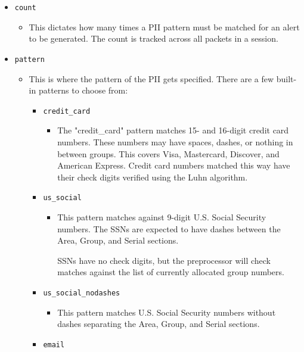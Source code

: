 \documentclass[english]{report}
\begin{document}
\begin{itemize}
\item[] \texttt{count}

\begin{itemize}
\item[] This dictates how many times a PII pattern must be matched for an alert
to be generated. The count is tracked across all packets in a session.
\end{itemize}

\item[] \texttt{pattern}

\begin{itemize}
\item[] This is where the pattern of the PII gets specified. There are a few
built-in patterns to choose from:

\begin{itemize}
\item[] \texttt{credit\_card}

\begin{itemize}
\item[] The "credit\_card" pattern matches 15- and 16-digit credit card
numbers. These numbers may have spaces, dashes, or nothing in
between groups. This covers Visa, Mastercard, Discover, and
American Express.
Credit card numbers matched this way have their check digits
verified using the Luhn algorithm.
\end{itemize}

\item[] \texttt{us\_social}

\begin{itemize}
\item[] This pattern matches against 9-digit U.S. Social Security numbers.
The SSNs are expected to have dashes between the Area, Group, and
Serial sections.

SSNs have no check digits, but the preprocessor will check matches
against the list of currently allocated group numbers.
\end{itemize}

\item[] \texttt{us\_social\_nodashes}

\begin{itemize}
\item[] This pattern matches U.S. Social Security numbers without dashes
separating the Area, Group, and Serial sections.
\end{itemize}

\item[] \texttt{email}


\end{itemize}
\end{itemize}
\end{itemize}
\end{document}

